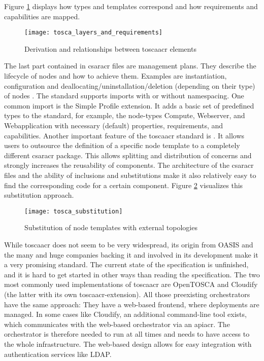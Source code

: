 Figure \ref{image:tosca_layers_and_requirements} displays how types and templates correspond and how requirements and capabilities are mapped.

\begin{figure}[H]
  \texttt{[image: tosca\_layers\_and\_requirements]}
  \centering
  \caption{Derivation and relationships between \gls{toscaacr} elements \cite{tosca_standard_v2}}
  \label{image:tosca_layers_and_requirements}
\end{figure}

The last part contained in \gls{csaracr} files are management plans. They describe the lifecycle of nodes and how to achieve them. Examples are instantiation, configuration and deallocating/uninstallation/deletion (depending on their type) of nodes \cite{tosca_standard_v2}.
\newline
The standard supports imports with or without namespacing. One common import is the Simple Profile extension.
It adds a basic set of predefined types to the standard, for example, the node-types Compute, Webserver, and Webapplication with necessary (default) properties, requirements, and capabilities.
\newline
Another important feature of the \gls{toscaacr} standard is . It allows users to outsource the definition of a specific node template to a completely different \gls{csaracr} package. This allows splitting and distribution of concerns and strongly increases the reusability of components. The architecture of the \gls{csaracr} files and the ability of inclusions and substitutions make it also relatively easy to find the corresponding code for a certain component. Figure \ref{image:tosca_substitution} visualizes this substitution approach.

\begin{figure}[H]
  \texttt{[image: tosca\_substitution]}
  \centering
  \caption{Substitution of node templates with external topologies \cite{tosca_standard_v2}}
  \label{image:tosca_substitution}
\end{figure}

While \gls{toscaacr} does not seem to be very widespread, its origin from OASIS and the many and huge companies backing it and involved in its development make it a very promising standard. The current state of the specification is unfinished, and it is hard to get started in other ways than reading the specification.
\newline
The two most commonly used implementations of \gls{toscaacr} are OpenTOSCA and Cloudify (the latter with its own \gls{toscaacr}-extension). All those preexisting orchestrators have the same approach: They have a web-based frontend, where deployments are managed. In some cases like Cloudify, an additional command-line tool exists, which communicates with the web-based orchestrator via an \gls{apiacr}. The orchestrator is therefore needed to run at all times and needs to have access to the whole infrastructure. The web-based design allows for easy integration with authentication services like LDAP.


